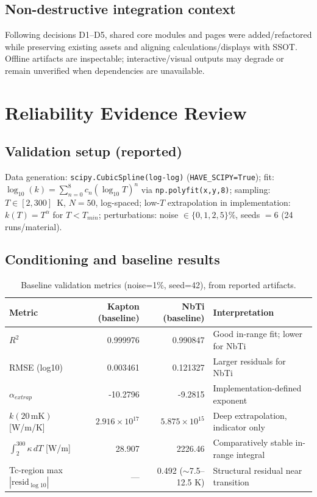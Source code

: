\documentclass[11pt,a4paper]{article}
\begin{document}
\subsection{Non-destructive integration context}
Following decisions D1--D5, shared core modules and pages were added/refactored while preserving existing assets and aligning calculations/displays with SSOT. Offline artifacts are inspectable; interactive/visual outputs may degrade or remain unverified when dependencies are unavailable.

\section{Reliability Evidence Review}
\subsection{Validation setup (reported)}
Data generation: \texttt{scipy.CubicSpline(log-log)} (\texttt{HAVE\_SCIPY=True}); fit: $\log_{10}(k)=\sum_{n=0}^{8} c_n (\log_{10}T)^n$ via \texttt{np.polyfit(x,y,8)}; sampling: $T\in[2,300]$~K, $N=50$, log-spaced; low-$T$ extrapolation in implementation: $k(T)=T^\alpha$ for $T<T_{min}$; perturbations: noise $\in\{0,1,2,5\}\%$, seeds $=6$ (24 runs/material).

\subsection{Conditioning and baseline results}
\begin{table}[h]
\centering
\begin{tabular}{@{}lrrp{4.6cm}@{}}
\toprule
Metric & Kapton (baseline) & NbTi (baseline) & Interpretation \\
\midrule
$R^2$ & 0.999976 & 0.990847 & Good in-range fit; lower for NbTi \\
RMSE (log10) & 0.003461 & 0.121327 & Larger residuals for NbTi \\
$\alpha_{extrap}$ & -10.2796 & -9.2815 & Implementation-defined exponent \\
$k(20\,\mathrm{mK})$ [W/m/K] & $2.916\times10^{17}$ & $5.875\times10^{15}$ & Deep extrapolation, indicator only \\
$\int_{2}^{300}\kappa\,dT$ [W/m] & 28.907 & 2226.46 & Comparatively stable in-range integral \\
Tc-region max $|\mathrm{resid}_{\log10}|$ & --- & 0.492 ($\sim$7.5--12.5 K) & Structural residual near transition \\
\bottomrule
\end{tabular}
\caption{Baseline validation metrics (noise=1\%, seed=42), from reported artifacts.}
\end{table}
\end{document}
